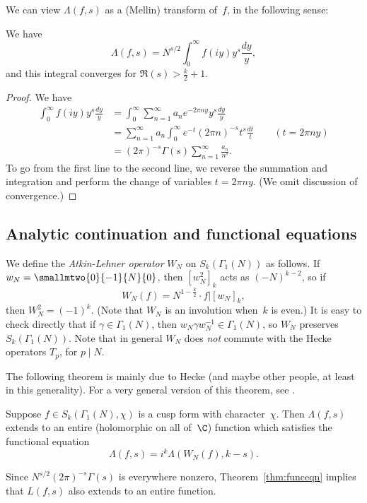 \documentclass{report}
\begin{document}
We can view $\Lambda(f,s)$ as a (Mellin) transform of~$f$,
in the following sense:
\begin{proposition}\label{prop:mellin}
We have
$$ \Lambda(f,s) = N^{s/2} \int_{0}^{\infty} f(iy) y^s \frac{dy}{y}, $$
and this integral converges for $\Re(s)>\frac{k}{2}+1$.
\end{proposition}
\begin{proof}
We have
\begin{align*}
 \int_0^\infty f(iy)y^s \frac{dy}{y} &=
   \int_0^\infty \sum_{n=1}^{\infty} a_n e^{-2\pi n y} y^s \frac{dy}{y} \\
  &= \sum_{n=1}^{\infty} a_n \int_{0}^{\infty} e^{-t}(2\pi n)^{-s} t^s\frac{dt}{t} \qquad(t=2\pi ny)\\
  &= (2\pi)^{-s} \Gamma(s) \sum_{n=1}^{\infty} \frac{a_n}{n^s}.
\end{align*}
To go from the first line to the second line, we reverse the summation
and integration and perform the change of variables $t=2\pi n y$.
(We omit discussion of convergence.)
\end{proof}


\subsection{Analytic continuation and functional equations}
We define the {\em Atkin-Lehner operator} $W_N$ on $S_k(\Gamma_1(N))$
as follows.  If $w_N=\smallmtwo{0}{-1}{N}{0}$, then $[w_N^2]_k$ acts
as $(-N)^{k-2}$, so if
$$
  W_N(f) = N^{1-\frac{k}{2}}\cdot f|[w_N]_k,
  $$
  then $W_N^2 = (-1)^k$. (Note that $W_N$ is an involution when~$k$
  is even.)  It is easy to check directly that if
  $\gamma\in\Gamma_1(N)$, then $w_N \gamma w_N^{-1}\in\Gamma_1(N)$, so
  $W_N$ preserves $S_k(\Gamma_1(N))$.  Note that in general $W_N$ does
  {\em not} commute with the Hecke operators $T_p$, for $p\mid N$.

  The following theorem is mainly due to Hecke (and maybe other
  people, at least in this generality).  For a very general version of
  this theorem, see \cite{winnie:newforms}.
\begin{theorem}\label{thm:funceqn}
Suppose $f\in S_k(\Gamma_1(N),\chi)$ is a cusp form with character~$\chi$.
Then $\Lambda(f,s)$ extends to an entire (holomorphic on all of~$\C$)
function which satisfies the functional equation
$$
  \Lambda(f,s) = i^k \Lambda(W_N(f), k-s).
$$
\end{theorem}
Since $N^{s/2}(2\pi)^{-s} \Gamma(s)$ is everywhere nonzero,
Theorem~\ref{thm:funceqn} implies that $L(f,s)$ also extends to
an entire function.
\end{document}
